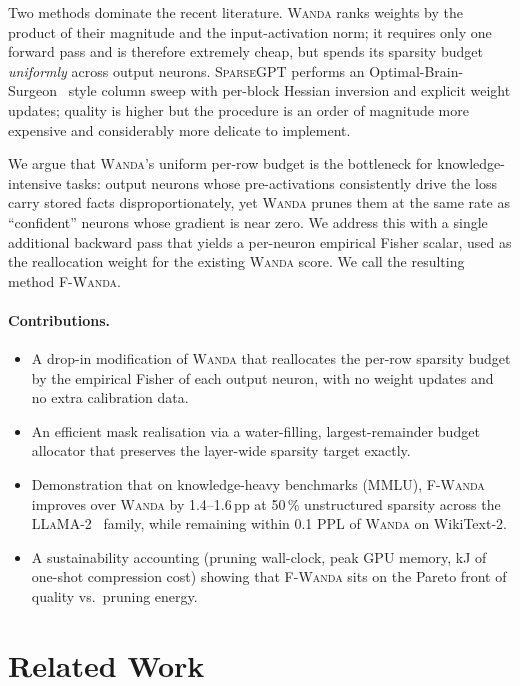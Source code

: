 \documentclass[11pt]{article}
\newcommand{\fwanda}{\textsc{F-Wanda}}
\newcommand{\wanda}{\textsc{Wanda}}
\newcommand{\sgpt}{\textsc{SparseGPT}}
\begin{document}
Two methods dominate the recent literature. \wanda{} ranks weights by the
product of their magnitude and the input-activation norm; it requires only
one forward pass and is therefore extremely cheap, but spends its sparsity
budget \emph{uniformly} across output neurons. \sgpt{} performs an
Optimal-Brain-Surgeon~\citep{hassibi1993obs} style column sweep with
per-block Hessian inversion and explicit weight updates; quality is higher
but the procedure is an order of magnitude more expensive and considerably
more delicate to implement.

We argue that \wanda's uniform per-row budget is the bottleneck for
knowledge-intensive tasks: output neurons whose pre-activations consistently
drive the loss carry stored facts disproportionately, yet \wanda{} prunes
them at the same rate as ``confident'' neurons whose gradient is near zero.
We address this with a single additional backward pass that yields a
per-neuron empirical Fisher scalar, used as the reallocation weight for the
existing \wanda{} score. We call the resulting method \fwanda.

\paragraph{Contributions.}
\begin{itemize}
\setlength{\itemsep}{1pt}
\item A drop-in modification of \wanda{} that reallocates the per-row sparsity
      budget by the empirical Fisher of each output neuron, with no weight
      updates and no extra calibration data.
\item An efficient mask realisation via a water-filling, largest-remainder
      budget allocator that preserves the layer-wide sparsity target exactly.
\item Demonstration that on knowledge-heavy benchmarks (MMLU), \fwanda{}
      improves over \wanda{} by 1.4--1.6\,pp at 50\,\% unstructured sparsity
      across the \textsc{LLaMA-2}~\citep{touvron2023llama2} family,
      while remaining within 0.1 PPL of \wanda{} on WikiText-2.
\item A sustainability accounting (pruning wall-clock, peak GPU memory,
      kJ of one-shot compression cost) showing that \fwanda{} sits on the
      Pareto front of quality vs.\ pruning energy.
\end{itemize}

\section{Related Work}
\end{document}
